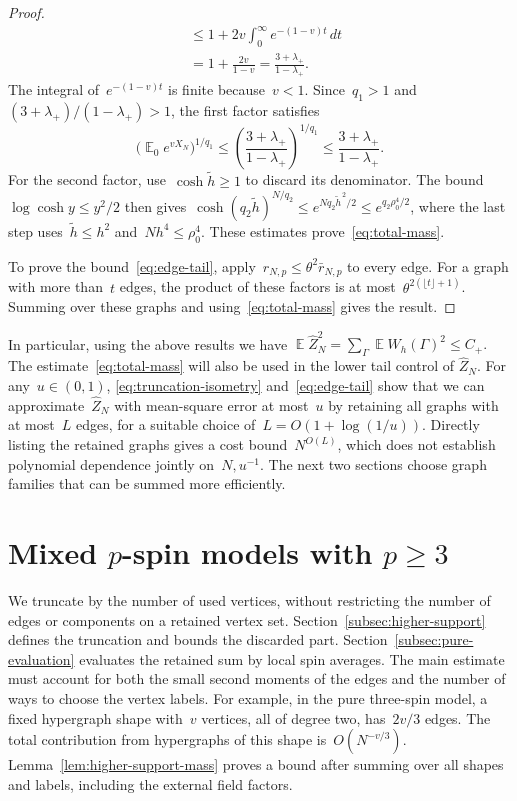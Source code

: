 \documentclass[letterpaper,11pt,reqno]{amsart}
\renewcommand{\ge}{\geqslant}
\renewcommand{\leq}{\leqslant}
\renewcommand{\geq}{\geqslant}
\DeclareMathOperator{\E}{\mathds{E}}
\begin{document}
\begin{proof}
\begin{align*}
&\leq1+2v\int_0^\infty e^{-(1-v)t}\,dt\\
&=1+\frac{2v}{1-v}=\frac{3+\lambda_+}{1-\lambda_+}.
\end{align*}
The integral of~$e^{-(1-v)t}$ is finite because~$v<1$. Since~$q_1>1$ and~$(3+\lambda_+)/(1-\lambda_+)>1$, the first factor satisfies
\begin{equation*}
\bigl(\E_0e^{vX_N}\bigr)^{1/q_1}
\leq\left(\frac{3+\lambda_+}{1-\lambda_+}\right)^{1/q_1}
\leq\frac{3+\lambda_+}{1-\lambda_+}.
\end{equation*}
For the second factor, use~$\cosh\widetilde h\geq1$ to discard its denominator. The bound~$\log\cosh y\leq y^2/2$ then gives~$\cosh(q_2\widetilde h)^{N/q_2}\leq e^{Nq_2\widetilde h^{\,2}/2}\leq e^{q_2\rho_0^4/2}$, where the last step uses~$\widetilde h\leq h^2$ and~$Nh^4\leq\rho_0^4$. These estimates prove~\eqref{eq:total-mass}.

To prove the bound~\eqref{eq:edge-tail}, apply~$r_{N,p}\leq\theta^2\bar r_{N,p}$ to every edge. For a graph with more than~$t$ edges, the product of these factors is at most~$\theta^{2(\lfloor t\rfloor+1)}$. Summing over these graphs and using~\eqref{eq:total-mass} gives the result.
\end{proof}

In particular, using the above results we have
\(
\E\widehat Z_N^2=\sum_\Gamma\E W_h(\Gamma)^2\leq C_+.
\)
The estimate~\eqref{eq:total-mass} will also be used in the lower tail control of $\hat{Z}_N$. For any~$u\in(0,1)$, \eqref{eq:truncation-isometry} and~\eqref{eq:edge-tail} show that we can approximate~$\widehat Z_N$ with mean-square error at most~$u$ by retaining all graphs with at most~$L$ edges, for a suitable choice of~$L=O(1+\log(1/u))$. Directly listing the retained graphs gives a cost bound~$N^{O(L)}$, which does not establish polynomial dependence jointly on~$N,u^{-1}$. The next two sections choose graph families that can be summed more efficiently.

\section{Mixed $p$-spin models with $p\ge 3$}\label{sec:pure}\label{sec:algorithm}

We truncate by the number of used vertices, without restricting the number of edges or components on a retained vertex set. Section~\ref{subsec:higher-support} defines the truncation and bounds the discarded part. Section~\ref{subsec:pure-evaluation} evaluates the retained sum by local spin averages. The main estimate must account for both the small second moments of the edges and the number of ways to choose the vertex labels. For example, in the pure three-spin model, a fixed hypergraph shape with~$v$ vertices, all of degree two, has~$2v/3$ edges. The total contribution from hypergraphs of this shape is~$O(N^{-v/3})$. Lemma~\ref{lem:higher-support-mass} proves a bound after summing over all shapes and labels, including the external field factors.
\end{document}
